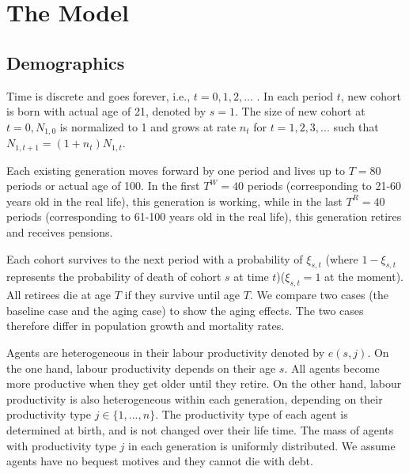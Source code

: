 \documentclass[12pt]{article}
\begin{document}
\section{The Model}

\subsection{Demographics}

Time is discrete and goes forever, i.e., $t =0,1,2,...$ . In each period $t$, new cohort is born with actual age of 21, denoted by $s=1$. The size of new cohort at $t=0, {N_{1,0}}$ is normalized to 1 and grows at rate $n_t$ for $t = 1,2,3,...$ such that $N_{1,t+1} = (1+n_t)N_{1,t}$.

Each existing generation moves forward by one period and lives up to $T=80$ periods or actual age of 100. In the first $T^W=40$ periods (corresponding to 21-60 years old in the real life), this generation is working, while in the last $T^R=40$ periods (corresponding to 61-100 years old in the real life), this generation retires and receives pensions.

Each cohort survives to the next period with a probability of $\xi_{s,t}$ (where $1-\xi_{s,t}$ represents the probability of death of cohort $s$ at time $t$)($\xi_{s,t}=1$ at the moment). All retirees die at age $T$ if they survive until age $T$. We  compare two cases (the baseline case and the aging case) to show the aging effects. The two cases therefore differ in population growth and mortality rates.

Agents are heterogeneous in their labour productivity denoted by $e(s,j)$. On the one hand, labour productivity depends on their age $s$. All agents become more productive when they get older until they retire. On the other hand, labour productivity is also heterogeneous within each generation, depending on their productivity type $j\in \{1,...,n\}$. The productivity type of each agent is determined at birth, and is not changed over their life time. The mass of agents with productivity type $j$ in each generation is uniformly distributed. We assume agents have no bequest motives and they cannot die with debt. 
\end{document}
